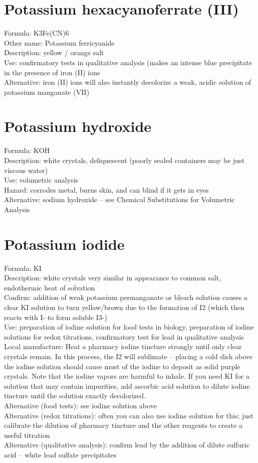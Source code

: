 \section{Potassium hexacyanoferrate (III)}
Formula: K3Fe(CN)6\\
Other name: Potassium ferricyanide\\
Description: yellow / orange salt\\
Use: confirmatory tests in qualitative analysis 
(makes an intense blue precipitate in the presence of iron (II) ions\\
Alternative: iron (II) ions will also instantly decolorize a weak, 
acidic solution of potassium manganate (VII)

\section{Potassium hydroxide}
Formula: KOH\\
Description: white crystals, 
deliquescent (poorly sealed containers may be just viscous water)\\
Use: volumetric analysis\\
Hazard: corrodes metal, 
burns skin, 
and can blind if it gets in eyes\\
Alternative: sodium hydroxide – 
see Chemical Substitutions for Volumetric Analysis

\section{Potassium iodide}
Formula: KI\\
Description: white crystals very similar in appearance to common salt, 
endothermic heat of solvation\\
Confirm: addition of weak potassium permanganate 
or bleach solution causes a clear KI solution to turn yellow/brown 
due to the formation of I2 (which then reacts with I- to form soluble I3-)\\
Use: preparation of iodine solution for food tests in biology, 
preparation of iodine solutions for redox titrations, 
confirmatory test for lead in qualitative analysis\\
Local manufacture: Heat a pharmacy iodine tincture strongly until 
only clear crystals remain. 
In this process, 
the I2 will sublimate – 
placing a cold dish above the iodine solution should cause must of the iodine 
to deposit as solid purple crystals. 
Note that the iodine vapors are harmful to inhale.
If you need KI for a solution that may contain impurities, 
add ascorbic acid solution to dilute iodine tincture 
until the solution exactly decolorized.\\
Alternative (food tests): see iodine solution above\\
Alternative (redox titrations): 
often you can also use iodine solution for this; 
just calibrate the dilution of pharmacy tincture 
and the other reagents to create a useful titration\\
Alternative (qualitative analysis): 
confirm lead by the addition of dilute sulfuric acid – 
white lead sulfate precipitates

